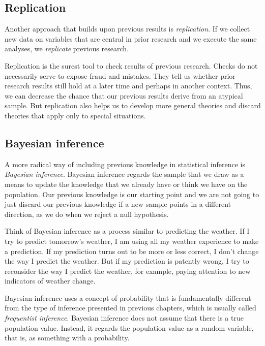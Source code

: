 \documentclass[a4paper]{book}
\theoremstyle{definition}
\theoremstyle{definition}
\theoremstyle{definition}
\theoremstyle{remark}
\begin{document}
\subsection{Replication}\label{replication}

Another approach that builds upon previous results is
\emph{replication}. If we collect new data on variables that are central
in prior research and we execute the same analyses, we \emph{replicate}
previous research.

Replication is the surest tool to check results of previous research.
Checks do not necessarily serve to expose fraud and mistakes. They tell
us whether prior research results still hold at a later time and perhaps
in another context. Thus, we can decrease the chance that our previous
results derive from an atypical sample. But replication also helps us to
develop more general theories and discard theories that apply only to
special situations.

\subsection{Bayesian inference}\label{bayesian-inference}

A more radical way of including previous knowledge in statistical
inference is \emph{Bayesian inference}. Bayesian inference regards the
sample that we draw as a means to update the knowledge that we already
have or think we have on the population. Our previous knowledge is our
starting point and we are not going to just discard our previous
knowledge if a new sample points in a different direction, as we do when
we reject a null hypothesis.

Think of Bayesian inference as a process similar to predicting the
weather. If I try to predict tomorrow's weather, I am using all my
weather experience to make a prediction. If my prediction turns out to
be more or less correct, I don't change the way I predict the weather.
But if my prediction is patently wrong, I try to reconsider the way I
predict the weather, for example, paying attention to new indicators of
weather change.

Bayesian inference uses a concept of probability that is fundamentally
different from the type of inference presented in previous chapters,
which is usually called \emph{frequentist inference}. Bayesian inference
does not assume that there is a true population value. Instead, it
regards the population value as a random variable, that is, as something
with a probability.
\end{document}
